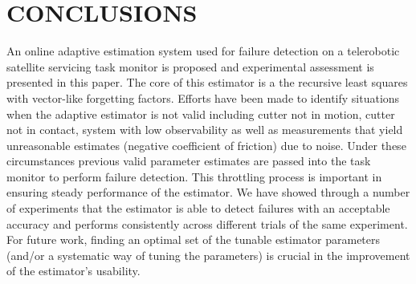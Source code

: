 \documentclass[letterpaper, 10 pt, conference]{ieeeconf}  %
\begin{document}
\section{CONCLUSIONS}
\label{sec:5}
An online adaptive estimation system used for failure detection on a telerobotic satellite servicing task monitor is proposed and experimental assessment is presented in this paper. The core of this estimator is a the recursive least squares with vector-like forgetting factors. Efforts have been made to identify situations 
when the adaptive estimator is not valid including cutter not in motion, cutter not in contact, system with low observability as well as measurements that yield unreasonable estimates (negative coefficient of friction) due to noise. Under these circumstances previous valid parameter estimates are passed into the task monitor to perform failure detection. This throttling process is important in ensuring steady performance of the estimator. We have showed through a number of experiments that the estimator is able to detect failures with an acceptable accuracy and performs consistently across different trials of the same experiment. For future work, finding an optimal set of the tunable estimator parameters (and/or a systematic way of tuning the parameters) is crucial in the improvement of the estimator's usability.





\label{Bibliography}



\end{document}
